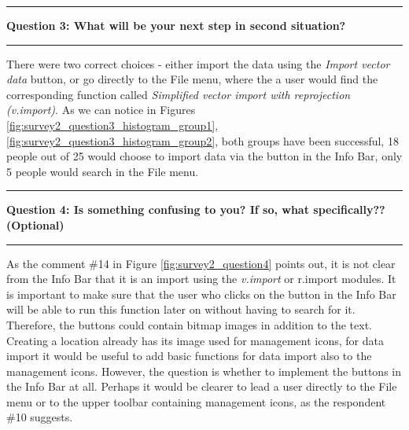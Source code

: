 \documentclass[a4paper,10pt,twoside]{article}
\begin{document}
\newpage
\vspace*{-1cm}
\par\noindent\rule{\textwidth}{0.4pt}
\noindent \textbf{Question 3: What will be your next step in second situation?}
\par\noindent\rule{\textwidth}{0.4pt}

\noindent There were two correct choices - either import the data using the \textit{Import vector data} button, or go directly to the File menu, where the a user would find the corresponding function called \textit{Simplified vector import with reprojection (v.import)}. As we can notice in Figures \ref{fig:survey2_question3_histogram_group1}, \ref{fig:survey2_question3_histogram_group2}, both groups have been successful, 18 people out of 25 would choose to import data via the button in the Info Bar, only 5 people would search in the File menu.

\par\noindent\rule{\textwidth}{0.4pt}
\noindent \textbf{Question 4: Is something confusing to you? If so, what specifically?? (Optional)}
\par\noindent\rule{\textwidth}{0.4pt}

\noindent As the comment \#14 in Figure \ref{fig:survey2_question4} points out, it is not clear from the Info Bar that it is an import using the \textit{v.import} or {r.import} modules.  It is important to make sure that the user who clicks on the button in the Info Bar will be able to run this function later on without having to search for it. Therefore, the buttons could contain bitmap images in addition to the text. Creating a location already has its image used for management icons, for data import it would be useful to add basic functions for data import also to the management icons. However, the question is whether to implement the buttons in the Info Bar at all. Perhaps it would be clearer to lead a user directly to the File menu or to the upper toolbar containing management icons, as the respondent \#10 suggests.
\end{document}

